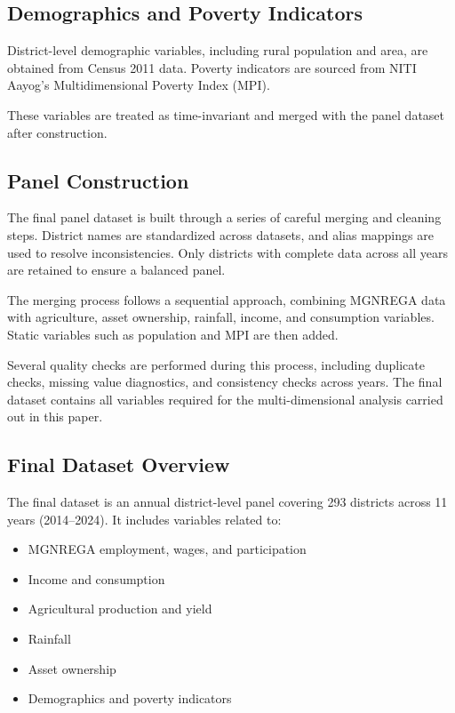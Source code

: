 \documentclass[12pt]{article}
\begin{document}
\subsection{Demographics and Poverty Indicators}

District-level demographic variables, including rural population and area, are obtained from Census 2011 data. Poverty indicators are sourced from NITI Aayog’s Multidimensional Poverty Index (MPI).

These variables are treated as time-invariant and merged with the panel dataset after construction.

\subsection{Panel Construction}

The final panel dataset is built through a series of careful merging and cleaning steps. District names are standardized across datasets, and alias mappings are used to resolve inconsistencies. Only districts with complete data across all years are retained to ensure a balanced panel.

The merging process follows a sequential approach, combining MGNREGA data with agriculture, asset ownership, rainfall, income, and consumption variables. Static variables such as population and MPI are then added.

Several quality checks are performed during this process, including duplicate checks, missing value diagnostics, and consistency checks across years. The final dataset contains all variables required for the multi-dimensional analysis carried out in this paper.

\subsection{Final Dataset Overview}

The final dataset is an annual district-level panel covering 293 districts across 11 years (2014–2024). It includes variables related to:

\begin{itemize}
\item MGNREGA employment, wages, and participation
\item Income and consumption
\item Agricultural production and yield
\item Rainfall
\item Asset ownership
\item Demographics and poverty indicators
\end{itemize}
\end{document}
